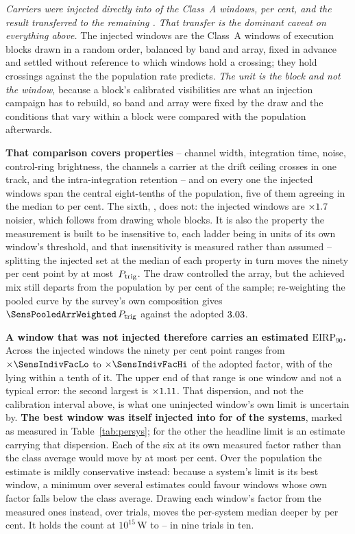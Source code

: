 \emph{Carriers were injected directly into \SensNInj{} of the \NWinA{}
Class~A windows, \SensNInjPct{} per cent, and the result transferred to the
remaining \SensNTransfer. That transfer is the dominant caveat on everything
above.} The injected windows are the Class~A windows of execution blocks
drawn in a random order, balanced by band and array, fixed in advance and
settled without reference to which windows hold a crossing; they hold
\SensNCrossAch{} crossings against the \SensNCrossExp{} the population rate
predicts. \emph{The unit is the block and not the window}, because a block's
calibrated visibilities are what an injection campaign has to rebuild, so
band and array were fixed by the draw and the conditions that vary within a
block were compared with the population afterwards.

\textbf{That comparison covers \RpNAxis{} properties} -- channel width,
integration time, noise, control-ring brightness, the channels a carrier at
the drift ceiling crosses in one track, and the intra-integration retention
-- and on every one the injected windows span the central eight-tenths of the
population, five of them agreeing in the median to \RpCovOtherPct{} per cent.
The sixth, \RpCovWorstAxis, does not: the injected windows are
$\times1.7$ noisier, which follows from drawing whole blocks. It
is also the property the measurement is built to be insensitive to, each
ladder being in units of its own window's threshold, and that insensitivity
is measured rather than assumed -- splitting the injected set at the median
of each property in turn moves the ninety per cent point by at most
\RpFacShiftMax\,$P_{\rm trig}$. The draw controlled the array, but the
achieved mix still departs from the population by \SensCovWorstPct{} per cent
of the sample; re-weighting the pooled curve by the survey's own composition
gives $\SensPooledArrWeighted\,P_{\rm trig}$ against the adopted
$3.03$.

\textbf{A window that was not injected therefore carries an estimated
$\mathrm{EIRP}_{90}$.} Across the injected windows the ninety per cent point
ranges from $\times\SensIndivFacLo$ to $\times\SensIndivFacHi$ of the
adopted factor, with \NmDispNTenth{} of the \SensNInj{} lying within a tenth
of it. The upper end of that range is one window and not a typical error: the
second largest is $\times1.11$. That dispersion, and not the calibration
interval above, is what one uninjected window's own limit is uncertain by.
\textbf{The best window was itself injected into for \SmcNMeasSys{} of the
\NSysClassA{} systems}, marked as measured in Table~\ref{tab:persys}; for the
other \SmcNEstSys{} the headline limit is an estimate carrying that
dispersion. Each of the six at its own measured
factor rather than the class average would move by at most \NmOwnDevPct{} per
cent. Over the population the estimate is mildly conservative instead:
because a system's limit is its best window, a minimum over several estimates
could favour windows whose own factor falls below the class average. Drawing each window's factor from the \SensNInj{} measured ones instead,
over \ScRsNTrial{} trials, moves the per-system median deeper by
\ScRsMedShiftPct{} per cent. It holds the count at $10^{15}$\,W to
\ScRsNLo--\ScRsNHi{} in nine trials in ten.

